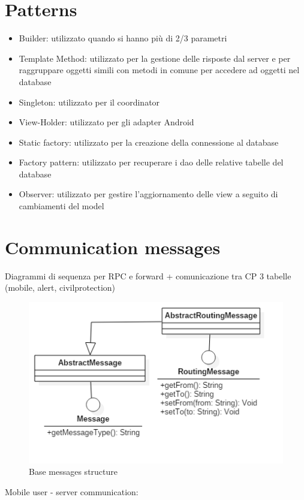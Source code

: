 \documentclass[a4paper,12pt]{report}
\begin{document}
\section{Patterns}
\begin{itemize}
\item Builder: utilizzato quando si hanno più di 2/3 parametri
\item Template Method: utilizzato per la gestione delle risposte dal server e per raggruppare oggetti simili con metodi in comune per accedere ad oggetti nel database
\item Singleton: utilizzato per il coordinator
\item View-Holder: utilizzato per gli adapter Android
\item Static factory: utilizzato per la creazione della connessione al database
\item Factory pattern: utilizzato per recuperare i dao delle relative tabelle del database
\item Observer: utilizzato per gestire l'aggiornamento delle view a seguito di cambiamenti del model
\end{itemize}

\section{Communication messages}
Diagrammi di sequenza per RPC e forward + comunicazione tra CP
3 tabelle (mobile, alert, civilprotection)

\begin{figure}[ht]
\centering
\includegraphics[scale=0.5]{figures/messages.png}
\caption{Base messages structure}
\end{figure}

Mobile user - server communication:
\end{document}
